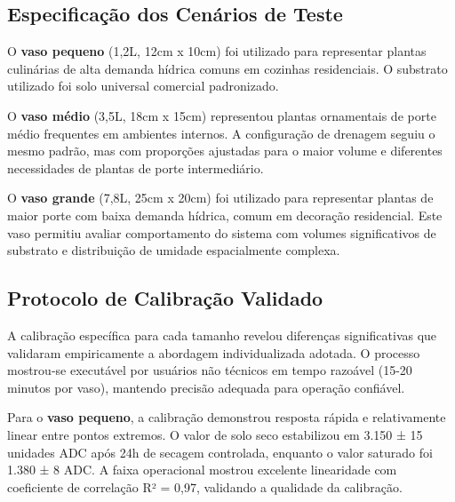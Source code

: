 \documentclass[twoside,english,brazilian]{UNISINOSmonografia}
\begin{document}

\subsection{Especificação dos Cenários de Teste}

O \textbf{vaso pequeno} (1,2L, 12cm x 10cm) foi utilizado para representar plantas culinárias de alta demanda hídrica comuns em cozinhas residenciais. O substrato utilizado foi solo universal comercial padronizado.

O \textbf{vaso médio} (3,5L, 18cm x 15cm) representou plantas ornamentais de porte médio frequentes em ambientes internos. A configuração de drenagem seguiu o mesmo padrão, mas com proporções ajustadas para o maior volume e diferentes necessidades de plantas de porte intermediário.

O \textbf{vaso grande} (7,8L, 25cm x 20cm) foi utilizado para representar plantas de maior porte com baixa demanda hídrica, comum em decoração residencial. Este vaso permitiu avaliar comportamento do sistema com volumes significativos de substrato e distribuição de umidade espacialmente complexa.


\subsection{Protocolo de Calibração Validado}

A calibração específica para cada tamanho revelou diferenças significativas que validaram empiricamente a abordagem individualizada adotada. O processo mostrou-se executável por usuários não técnicos em tempo razoável (15-20 minutos por vaso), mantendo precisão adequada para operação confiável.

Para o \textbf{vaso pequeno}, a calibração demonstrou resposta rápida e relativamente linear entre pontos extremos. O valor de solo seco estabilizou em 3.150 ± 15 unidades ADC após 24h de secagem controlada, enquanto o valor saturado foi 1.380 ± 8 ADC. A faixa operacional mostrou excelente linearidade com coeficiente de correlação R² = 0,97, validando a qualidade da calibração.
\end{document}

